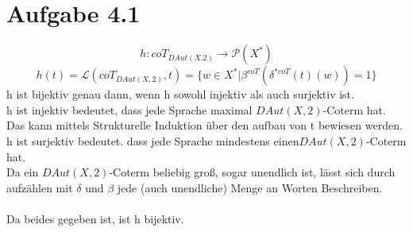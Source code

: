 \section*{Aufgabe 4.1}
\[h:coT_{DAut(X.2)}\rightarrow\mathcal{P}(X^*)\]
\[ h(t)=\mathcal{L}(coT_{DAut(X,2)},t)=\{w\in X^*|\beta^{coT}(\delta^{*coT}(t)(w))=1\}\]
h ist bijektiv genau dann, wenn h sowohl injektiv als auch surjektiv ist.\\
h ist injektiv bedeutet, dass jede Sprache maximal $DAut(X,2)$-Coterm hat.\\
Das kann mittels Strukturelle Induktion über den aufbau von t bewiesen werden.\\
h ist surjektiv bedeutet. dass jede Sprache mindestens einen$DAut(X,2)$-Coterm hat.\\
Da ein $DAut(X,2)$-Coterm beliebig groß, sogar unendlich ist, lässt sich durch aufzählen mit $\delta$ und $\beta$ jede (auch unendliche) Menge an Worten Beschreiben.\\
\\
Da beides gegeben ist, ist h bijektiv.

